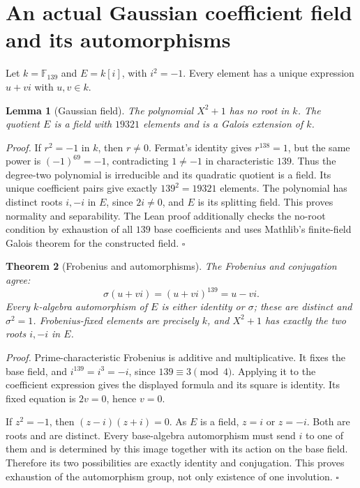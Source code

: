 \documentclass[11pt,letterpaper]{article}
\newtheorem{theorem}{Theorem}
\newtheorem{lemma}[theorem]{Lemma}
\newenvironment{proof}{\noindent\textit{Proof.}}{\hfill\(\square\)}
\begin{document}
\section{An actual Gaussian coefficient field and its automorphisms}

Let \(k=\mathbb F_{139}\) and \(E=k[i]\), with \(i^2=-1\). Every element has a unique expression \(u+vi\) with \(u,v\in k\).

\begin{lemma}[Gaussian field]
The polynomial \(X^2+1\) has no root in \(k\). The quotient \(E\) is a field with \(19321\) elements and is a Galois extension of \(k\).
\end{lemma}
\begin{proof}
If \(r^2=-1\) in \(k\), then \(r\ne0\). Fermat's identity gives \(r^{138}=1\), but the same power is \((-1)^{69}=-1\), contradicting \(1\ne-1\) in characteristic \(139\). Thus the degree-two polynomial is irreducible and its quadratic quotient is a field. Its unique coefficient pairs give exactly \(139^2=19321\) elements. The polynomial has distinct roots \(i,-i\) in \(E\), since \(2i\ne0\), and \(E\) is its splitting field. This proves normality and separability. The Lean proof additionally checks the no-root condition by exhaustion of all \(139\) base coefficients and uses Mathlib's finite-field Galois theorem for the constructed field.
\end{proof}

\begin{theorem}[Frobenius and automorphisms]
The Frobenius and conjugation agree:
\[
\sigma(u+vi)=(u+vi)^{139}=u-vi.
\]
Every \(k\)-algebra automorphism of \(E\) is either identity or \(\sigma\); these are distinct and \(\sigma^2=1\). Frobenius-fixed elements are precisely \(k\), and \(X^2+1\) has exactly the two roots \(i,-i\) in \(E\).
\end{theorem}
\begin{proof}
Prime-characteristic Frobenius is additive and multiplicative. It fixes the base field, and \(i^{139}=i^3=-i\), since \(139\equiv3\pmod4\). Applying it to the coefficient expression gives the displayed formula and its square is identity. Its fixed equation is \(2v=0\), hence \(v=0\).

If \(z^2=-1\), then \((z-i)(z+i)=0\). As \(E\) is a field, \(z=i\) or \(z=-i\). Both are roots and are distinct. Every base-algebra automorphism must send \(i\) to one of them and is determined by this image together with its action on the base field. Therefore its two possibilities are exactly identity and conjugation. This proves exhaustion of the automorphism group, not only existence of one involution.
\end{proof}
\end{document}
